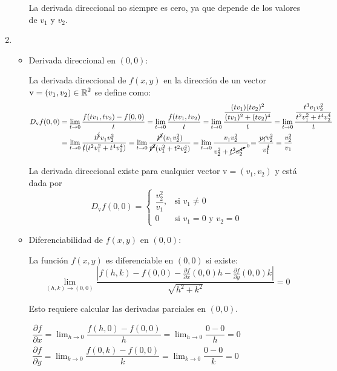 \begin{enumerate}[label=\color{red}\textbf{\arabic*)}, leftmargin=*]
\begin{itemize}
	La derivada direccional no siempre es cero, ya que depende de los valores de $v_1$ y $v_2$.
	\end{itemize}
	
	\item {}
	
\begin{itemize}
\item Derivada direccional en $(0,0)$:

	La derivada direccional de $f(x,y)$ en la dirección de un vector $\mathrm{v}=(v_1,v_2)\in\operatorname{\mathbb{R}}^2$ se define como:
	\[ \begin{aligned}
	D_{\mathrm{v}}f(0,0)&=\lim_{t\to0}\dfrac{f(tv_1,tv_2)-f(0,0)}{t}=\lim_{t\to0}\dfrac{f(tv_1,tv_2)}{t}=\lim_{t\to0}\dfrac{\dfrac{(tv_1)(tv_2)^{2}}{(tv_1)^{2}+(tv_2)^{4}}}{t}=\lim_{t\to0}\dfrac{\dfrac{t^{3}v_1v_2^{2}}{t^2v_1^2+t^4v_2^4}}{t}\\
	&=\lim_{t\to0}\dfrac{t^{\cancel{3}}v_1v_2^2}{\cancel{t}(t^2v_1^2+t^4v_2^4)}=\lim_{t\to0}\dfrac{\cancel{t^{2}}(v_1v_2^2)}{\cancel{t^{2}}(v_1^2+t^2v_2^4)}=\lim_{t\to0}\dfrac{v_1v_2^2}{v_2^2+\cancelto{0}{t^2v_2^4}~~}=\dfrac{\cancel{v_1}v_2^2}{v_1^{\cancel{2}}}=\dfrac{v_2^2}{v_1}
	\end{aligned} \]
	
	La derivada direccional existe para cualquier vector $\mathrm{v}=(v_1,v_2)$ y está dada por \[ D_{\mathrm{v}}f(0,0)=\begin{cases}
	\dfrac{v_2^2}{v_1}, & \text{si }v_1\neq0\\
	0 & \text{si }v_1=0\text{ y }v_2=0
	\end{cases} \]
	\item Diferenciabilidad de $f(x,y)$ en $(0,0)$:
	
	La función $f(x,y)$ es diferenciable en $(0,0)$ si existe: \[ \lim_{(h,k)\to(0,0)}\dfrac{\left|f(h,k)-f(0,0)-\frac{\partial f}{\partial x}(0,0)h-\frac{\partial f}{\partial y}(0,0)k\right|}{\sqrt{h^2+k^2}}=0 \]
	
	Esto requiere calcular las derivadas parciales en $(0,0)$.
	
	$\begin{array}{l}
	\dfrac{\partial f}{\partial x}=\lim_{h\to0}\dfrac{f(h,0)- f(0,0)}{h}=\lim_{h\to0}\dfrac{0-0}{h}=0\\
	\dfrac{\partial f}{\partial y}=\lim_{k\to0}\dfrac{f(0,k)- f(0,0)}{k}=\lim_{k\to0}\dfrac{0-0}{k}=0\\
	\end{array}$
	

\end{itemize}
\end{enumerate}

